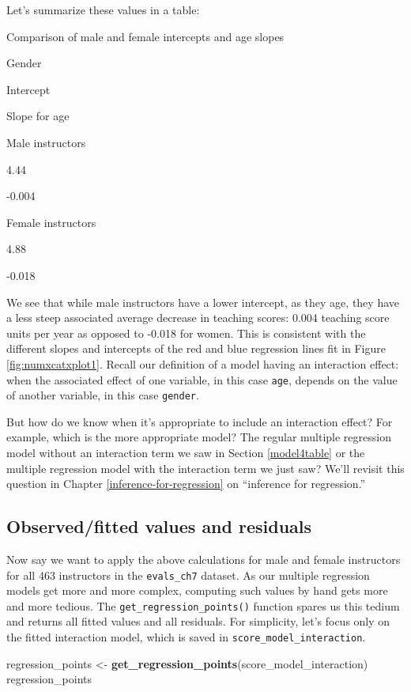 \documentclass[12pt,]{krantz}
\makeatletter
\newenvironment{Shaded}{\begin{snugshade}}{\end{snugshade}}
\newcommand{\KeywordTok}[1]{\textcolor[rgb]{0.27,0.27,0.27}{\textbf{#1}}}
\newcommand{\StringTok}[1]{\textcolor[rgb]{0.5,0.5,0.5}{#1}}
\newcommand{\NormalTok}[1]{#1}
\newenvironment{kframe}{%
\medskip{}
\setlength{\fboxsep}{.8em}
 \def\at@end@of@kframe{}%
 \ifinner\ifhmode%
  \def\at@end@of@kframe{\end{minipage}}%
  \begin{minipage}{\columnwidth}%
 \fi\fi%
 \def\FrameCommand##1{\hskip\@totalleftmargin \hskip-\fboxsep
 \colorbox{shadecolor}{##1}\hskip-\fboxsep
     \hskip-\linewidth \hskip-\@totalleftmargin \hskip\columnwidth}%
 \MakeFramed {\advance\hsize-\width
   \@totalleftmargin\z@ \linewidth\hsize
   \@setminipage}}%
 {\par\unskip\endMakeFramed%
 \at@end@of@kframe}
\renewenvironment{Shaded}{\begin{kframe}}{\end{kframe}}
\makeatother
\begin{document}
Let's summarize these values in a table:

\label{tab:unnamed-chunk-254}Comparison of male and female intercepts and
age slopes

Gender

Intercept

Slope for age

Male instructors

4.44

-0.004

Female instructors

4.88

-0.018

We see that while male instructors have a lower intercept, as they age,
they have a less steep associated average decrease in teaching scores:
0.004 teaching score units per year as opposed to -0.018 for women. This
is consistent with the different slopes and intercepts of the red and
blue regression lines fit in Figure \ref{fig:numxcatxplot1}. Recall our
definition of a model having an interaction effect: when the associated
effect of one variable, in this case \texttt{age}, depends on the value
of another variable, in this case \texttt{gender}.

But how do we know when it's appropriate to include an interaction
effect? For example, which is the more appropriate model? The regular
multiple regression model without an interaction term we saw in Section
\ref{model4table} or the multiple regression model with the interaction
term we just saw? We'll revisit this question in Chapter
\ref{inference-for-regression} on ``inference for regression.''

\subsection{Observed/fitted values and residuals}\label{model4points}

Now say we want to apply the above calculations for male and female
instructors for all 463 instructors in the \texttt{evals\_ch7} dataset.
As our multiple regression models get more and more complex, computing
such values by hand gets more and more tedious. The
\texttt{get\_regression\_points()} function spares us this tedium and
returns all fitted values and all residuals. For simplicity, let's focus
only on the fitted interaction model, which is saved in
\texttt{score\_model\_interaction}.

\begin{Shaded}
\begin{Highlighting}[]
\NormalTok{regression_points <-}\StringTok{ }\KeywordTok{get_regression_points}\NormalTok{(score_model_interaction)}
\NormalTok{regression_points}
\end{Highlighting}
\end{Shaded}
\end{document}
